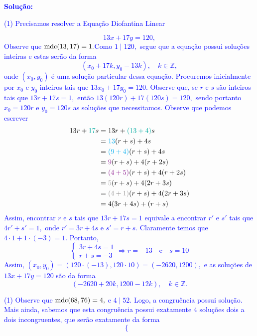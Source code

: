 \documentclass[oneside,a4paper,12pt]{article}
\newcommand{\mdc}{{\rm mdc}}
\newcommand{\negrito}[1]{\mbox{\boldmath{$#1$}}}
\theoremstyle{Colorido}
\theoremstyle{solu}
\theoremstyle{dotlessP}
\newcommand{\solucao}[1]{\textcolor{blue}{\textbf{Solução:} #1}}
\begin{document}
\solucao{\begin{tasks}[counter-format={(tsk[a])},label-width=3.6ex, label-format = {\bfseries}, column-sep = {20pt}](1)
\task[\textcolor{blue}{$\negrito{(a)} $}]
Precisamos resolver a Equação Diofantina Linear
\end{tasks}
\[13x + 17y = 120,\] Observe que $\mdc(13,17) = 1.$Como $1 \mid 120,$ segue que a equação possui soluções inteiras e estas serão da forma 
	\[(x_0 + 17k, y_0 - 13k), \quad k \in \mathbb{Z},\]onde $(x_0, y_0)$ é uma solução particular dessa equação. 
	Procuremos inicialmente por $x_0$ e $y_0$ inteiros tais que $13 x_0 + 17 y_0 = 120.$ Observe que, se $r$ e $s$ são inteiros tais que $13 r + 17 s = 1,$ então $13 (120r) + 17 (120s) = 120,$ sendo portanto $x_0 = 120r$ e $y_0 = 120s$ as soluções que necessitamos.
Observe que podemos escrever\begin{align*}13r + \textcolor{Emerald}{17}s &= 13r + \textcolor{Emerald}{(13+4)}s \\&= \textcolor{Cyan}{13}(r+s) + 4s \\&= \textcolor{Cyan}{(9+4)}(r+s) + 4s \\&= \textcolor{Plum}{9}(r+s) + 4(r+2s) \\&= \textcolor{Plum}{(4+5)}(r+s) + 4(r+2s) \\&= \textcolor{Gray}{5}(r+s) + 4(2r+3s) \\&= \textcolor{Gray}{(4+1)}(r+s) + 4(2r+3s) \\&= 4(3r+4s) + (r+s)
	\end{align*}Assim, encontrar $r$ e $s$ tais que $13r+17s = 1$ equivale a encontrar $r'$ e $s'$ tais que $4r'+s' = 1,$ onde $r' = 3r+4s$ e $s' = r+s.$ Claramente temos que $4 \cdot 1 + 1 \cdot (-3) = 1.$ Portanto,
	\[\begin{cases}3r+4s = 1 \\r+s = -3
	\end{cases} \Rightarrow r = -13 \quad \mbox{e} \quad s = 10\]
	Assim, $(x_0, y_0) = (120 \cdot (-13),120 \cdot 10) = (-2620, 1200),$ e as soluções de $13x + 17y = 120$ são da forma
	\[
	(-2620 + 20k, 1200 - 12k), \quad k \in \mathbb{Z}.
	\]
\begin{tasks}[counter-format={(tsk[a])},label-width=3.6ex, label-format = {\bfseries}, column-sep = {20pt}](1)
\task[\textcolor{blue}{$\negrito{(b)} $}] Observe que $\mdc(68, 76) = 4,$ e $4 \mid 52.$ Logo, a congruência possui solução. Mais ainda, sabemos que esta congruência possui exatamente $4$ soluções dois a dois incongruentes, que serão exatamente da forma
\[
\begin{cases}

\end{cases}\]
\end{tasks}}
\end{document}
